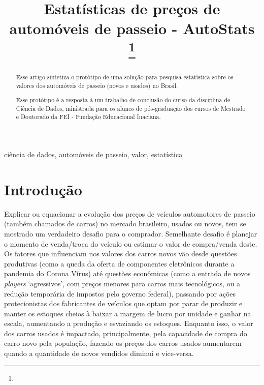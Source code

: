 \documentclass[conference]{IEEEtran}
\begin{document}
\title{Estatísticas de preços de automóveis de passeio - AutoStats\\
\thanks{}
}

\author{
}

\maketitle

\begin{abstract}
Esse artigo sintetiza o protótipo de uma solução para pesquisa estatística sobre os valores dos automóveis de passeio (novos e usados) no Brasil.

Esse protótipo é a resposta à um trabalho de conclusão do curso da disciplina de Ciência de Dados, ministrada para os alunos de pós-graduação dos cursos de Mestrado e Doutorado da FEI - Fundação Educacional Inaciana.
\end{abstract}

\begin{IEEEkeywords}
ciência de dados, automóveis de passeio, valor, estatística
\end{IEEEkeywords}

\section{Introdução}
Explicar ou equacionar a evolução dos preços de veículos automotores de passeio (também chamados de carros) no mercado brasileiro, usados ou novos, tem se mostrado um verdadeiro desafio para o comprador. Semelhante desafio é planejar o momento de venda/troca do veículo ou estimar o valor de compra/venda deste. Os fatores que influenciam nos valores dos carros novos vão desde questões produtivas (como a queda da oferta de componentes eletrônicos durante a pandemia do Corona Vírus) até questões econômicas (como a entrada de novos \textit{players} `agressivos', com preços menores para carros mais tecnológicos, ou a redução temporária de impostos pelo governo federal), passando por ações protecionistas dos fabricantes de veículos que optam por parar de produzir e manter os estoques cheios à baixar a margem de lucro por unidade e ganhar na escala, aumentando a produção e esvaziando os estoques. Enquanto isso, o valor dos carros usados é impactado, principalmente, pela capacidade de compra do carro novo pela população, fazendo os preços dos carros usados aumentarem quando a quantidade de novos vendidos diminui e vice-versa. 
\end{document}
